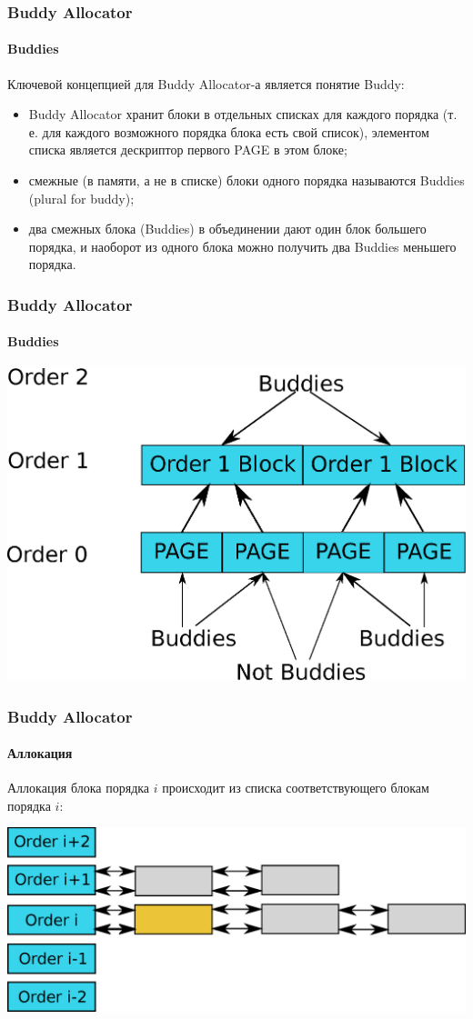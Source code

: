 \begin{frame}
\frametitle{Buddy Allocator}
\framesubtitle{Buddies}

Ключевой концепцией для Buddy Allocator-а является понятие Buddy:
\begin{itemize}
  \item Buddy Allocator хранит блоки в отдельных списках для каждого порядка (т. е. для каждого возможного порядка блока есть свой список), элементом списка является дескриптор первого PAGE в этом блоке;
  \item смежные (в памяти, а не в списке) блоки одного порядка называются Buddies (plural for buddy);
  \item два смежных блока (Buddies) в объединении дают один блок большего порядка, и наоборот из одного блока можно получить два Buddies меньшего порядка.
\end{itemize}

\end{frame}

\begin{frame}
\frametitle{Buddy Allocator}
\framesubtitle{Buddies}

\includegraphics[width=.9\linewidth]{buddy-buddies}

\end{frame}

\begin{frame}
\frametitle{Buddy Allocator}
\framesubtitle{Аллокация}

Аллокация блока порядка $i$ происходит из списка соответствующего блокам порядка $i$:

\includegraphics[width=.9\linewidth]{buddy-alloc0}

\end{frame}

